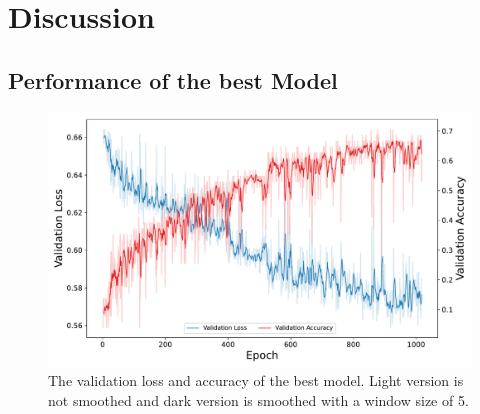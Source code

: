 


\section{Discussion}
\label{section4}

\subsection{Performance of the best Model}%
\begin{figure}[h!]
    \centering
    \captionsetup{width=.7\linewidth}
    \includegraphics[width=1\textwidth]{figures/loss_acc_best.pdf}
    \caption{
        The validation loss and accuracy of the best model. Light version is not smoothed 
        and dark version is smoothed with a window size of 5.}
    \label{fig:loss_acc_best}
\end{figure}
